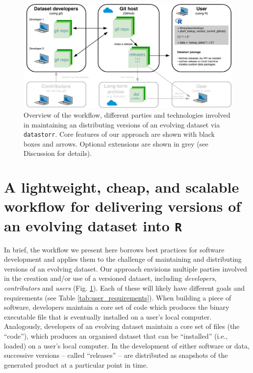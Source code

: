 \documentclass[a4paper,num-refs]{oup-contemporary}
\begin{document}
\begin{figure}[!hb]
\centering
\includegraphics[width=\linewidth]{figures/Figure-stack.pdf}
\caption{Overview of the workflow, different parties and technologies involved in maintaining an distributing versions of an evolving dataset via \texttt{datastorr}.  Core features of our approach are shown with black boxes and arrows. Optional extensions are shown in grey (see Discussion for details).}
\label{fig:technology_stack}
\end{figure}

\section{A lightweight, cheap, and scalable workflow for delivering versions of an evolving dataset into \texttt{R}}

In brief, the workflow we present here borrows best practices for software development \cite{Perez-Riverol-2016} and applies them to the challenge of maintaining and distributing versions of an evolving dataset. Our approach envisions multiple parties involved in the creation and/or use of a versioned dataset, including \emph{developers}, \emph{contributors} and \emph{users} (Fig. \ref{fig:technology_stack}). Each of these will likely have different goals and requirements (see Table \ref{tab:user_requirements}). When building a piece of software, developers maintain a core set of code which produces the binary executable file that is eventually installed on a user's local computer. Analogously, developers of an evolving dataset maintain a core set of files (the ``code''), which produces an organised dataset that can be ``installed'' (i.e., loaded) on a user's local computer. In the development of either software or data, successive versions -- called ``releases'' -- are distributed as snapshots of the generated product at a particular point in time. 
\end{document}
